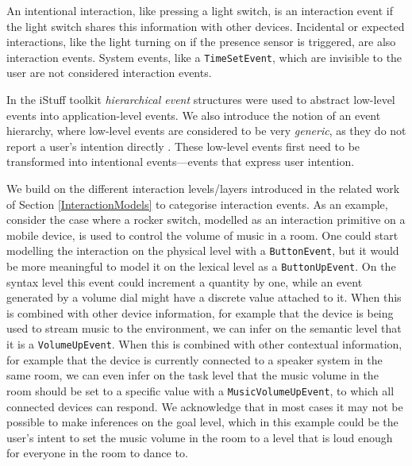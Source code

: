 An intentional interaction, like pressing a light switch, is an interaction event if the light switch shares this information with other devices. Incidental or expected interactions, like the light turning on if the presence sensor is triggered, are also interaction events. System events, like a \texttt{TimeSetEvent}, which are invisible to the user are not considered interaction events.


In the iStuff toolkit \cite{Ballagas2003} \emph{hierarchical event} structures were used to abstract low-level events into application-level events.  We also introduce the notion of an event hierarchy, where low-level events are considered to be very \emph{generic}, as they do not report a user's intention directly \cite{Niezen2011}. These low-level events first need to be transformed into intentional events---events that express user intention.

We build on the different interaction levels/layers introduced in the related work of Section \ref{InteractionModels} to categorise interaction events. As an example, consider the case where a rocker switch, modelled as an interaction primitive on a mobile device, is used to control the volume of music in a room. One could start modelling the interaction on the physical level with a \texttt{ButtonEvent}, but it would be more meaningful to model it on the lexical level as a \texttt{ButtonUpEvent}. On the syntax level this event could increment a quantity by one, while an event generated by a volume dial might have a discrete value attached to it. When this is combined with other device information, for example that the device is being used to stream music to the environment, we can infer on the semantic level that it is a \texttt{VolumeUpEvent}. When this is combined with other contextual information, for example that the device is currently connected to a speaker system in the same room, we can even infer on the task level that the music volume in the room should be set to a specific value with a \texttt{MusicVolumeUpEvent}, to which all connected devices can respond. We acknowledge that in most cases it may not be possible to make inferences on the goal level, which in this example could be the user's intent to set the music volume in the room to a level that is loud enough for everyone in the room to dance to.

